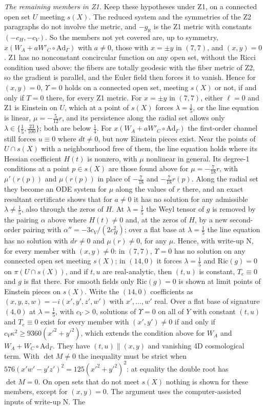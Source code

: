 \documentclass[11pt]{article}
\theoremstyle{remark}
\begin{document}
\emph{The remaining members in Z1.} Keep these hypotheses under Z1, on a connected open set $U$ meeting $s(X)$. The reduced system and the symmetries of the Z2 paragraphs do not involve the metric, and $-g_\aleph$ is the Z1 metric with constants $(-c_H,-c_V)$. So the members not yet covered are, up to symmetry, $x(W_A+aW'_C\circ\mathrm{Ad}_\Gamma)$ with $a\neq0$, those with $x=\pm y$ in $(7,7)$, and $(x,y)=0$. Z1 has no nonconstant concircular function on any open set, without the Ricci condition used above: the fibers are totally geodesic with the fiber metric of Z2, so the gradient is parallel, and the Euler field then forces it to vanish. Hence for $(x,y)=0$, $\Upsilon=0$ holds on a connected open set, meeting $s(X)$ or not, if and only if $T=0$ there, for every Z1 metric. For $x=\pm y$ in $(7,7)$, either $\ell=0$ and Z1 is Einstein on $U$, which at a point of $s(X)$ forces $\lambda=\tfrac15$, or the line equation is linear, $\mu=-\tfrac5{12}r$, and its persistence along the radial set allows only $\lambda\in\{\tfrac15,\tfrac{23}{100}\}$; both are below $\tfrac14$. For $x(W_A+aW'_C\circ\mathrm{Ad}_\Gamma)$ the first-order channel still forces $u\equiv0$ where $dt\neq0$, but now Einstein pieces exist. Near the points of $U\cap s(X)$ with a neighbourhood free of them, the line equation holds where its Hessian coefficient $H(t)$ is nonzero, with $\mu$ nonlinear in general. Its degree-1 conditions at a point $p\in s(X)$ are those found above for $\mu=-\tfrac7{18}r$, with $\mu'(r(p))$ and $\mu(r(p))$ in place of $-\tfrac7{18}$ and $-\tfrac7{18}r(p)$. Along the radial set they become an ODE system for $\mu$ along the values of $r$ there, and an exact resultant certificate shows that for $a\neq0$ it has no solution for any admissible $\lambda\neq\tfrac15$, also through the zeros of $H$. At $\lambda=\tfrac15$ the Weyl tensor of $g$ is removed by the pairing $\alpha$ above where $H(t)\neq0$ and, at the zeros of $H$, by a new second-order pairing with $\alpha''=-3c_V/(2c_H^2)$; over a flat base at $\lambda=\tfrac15$ the line equation has no solution with $dr\neq0$ and $\mu(r)\neq0$, for any $\mu$. Hence, with write-up N, for every member with $(x,y)\neq0$: in $(7,7)$, $\Upsilon=0$ has no solution on any connected open set meeting $s(X)$; in $(14,0)$ it forces $\lambda=\tfrac15$ and $\mathrm{Ric}(g)=0$ on $\pi(U\cap s(X))$, and if $t,u$ are real-analytic, then $(t,u)$ is constant, $T_e\equiv0$ and $g$ is flat there. For smooth fields only $\mathrm{Ric}(g)=0$ is shown at limit points of Einstein pieces on $s(X)$. Write the $(14,0)$ coefficients as $(x,y,z,w)=-i(x',y',z',w')$ with $x',\dots,w'$ real. Over a flat base of signature $(4,0)$ at $\lambda=\tfrac15$, with $c_V>0$, solutions of $\Upsilon=0$ on all of $Y$ with constant $(t,u)$ and $T_e\equiv0$ exist for every member with $(x',y')\neq0$ if and only if $c_V\kappa^2\ge9360(x'^2+y'^2)$, which extends the condition above for $W_A$ and $W_A+W_C\circ\mathrm{Ad}_\Gamma$. They have $(t,u)\parallel(x,y)$ and vanishing 4D cosmological term. With $\det M\neq0$ the inequality must be strict when $576(x'w'-y'z')^2=125(x'^2+y'^2)^2$: at equality the double root has $\det M=0$. On open sets that do not meet $s(X)$ nothing is shown for these members, except for $(x,y)=0$. The argument uses the computer-assisted inputs of write-up N. The 
\end{document}
